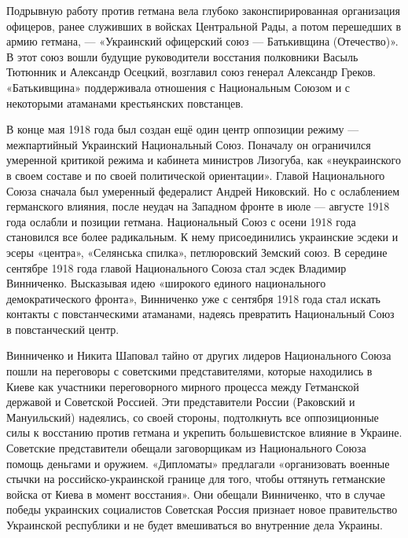 \begin{itemize}
Подрывную работу против гетмана вела глубоко законспирированная организация
офицеров, ранее служивших в войсках Центральной Рады, а потом перешедших в
армию гетмана, — «Украинский офицерский союз — Батькивщина (Отечество)». В этот
союз вошли будущие руководители восстания полковники Васыль Тютюнник и
Александр Осецкий, возглавил союз генерал Александр Греков. «Батькивщина»
поддерживала отношения с Национальным Союзом и с некоторыми атаманами
крестьянских повстанцев.


В конце мая 1918 года был создан ещё один центр оппозиции режиму — межпартийный
Украинский Национальный Союз. Поначалу он ограничился умеренной критикой режима
и кабинета министров Лизогуба, как «неукраинского в своем составе и по своей
политической ориентации». Главой Национального Союза сначала был умеренный
федералист Андрей Никовский. Но с ослаблением германского влияния, после неудач
на Западном фронте в июле — августе 1918 года ослабли и позиции гетмана.
Национальный Союз с осени 1918 года становился все более радикальным. К нему
присоединились украинские эсдеки и эсеры «центра», «Селянська спилка»,
петлюровский Земский союз. В середине сентябре 1918 года главой Национального
Союза стал эсдек Владимир Винниченко. Высказывая идею «широкого единого
национального демократического фронта», Винниченко уже с сентября 1918 года
стал искать контакты с повстанческими атаманами, надеясь превратить
Национальный Союз в повстанческий центр.

Винниченко и Никита Шаповал тайно от других лидеров Национального Союза пошли
на переговоры с советскими представителями, которые находились в Киеве как
участники переговорного мирного процесса между Гетманской державой и Советской
Россией. Эти представители России (Раковский и Мануильский) надеялись, со своей
стороны, подтолкнуть все оппозиционные силы к восстанию против гетмана и
укрепить большевистское влияние в Украине. Советские представители обещали
заговорщикам из Национального Союза помощь деньгами и оружием. «Дипломаты»
предлагали «организовать военные стычки на российско-украинской границе для
того, чтобы оттянуть гетманские войска от Киева в момент восстания». Они
обещали Винниченко, что в случае победы украинских социалистов Советская Россия
признает новое правительство Украинской республики и не будет вмешиваться во
внутренние дела Украины.


\end{itemize}
